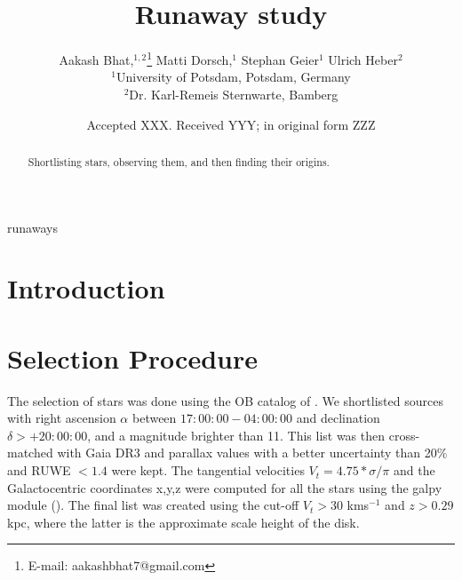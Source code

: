 \documentclass[fleqn,usenatbib]{mnras}
\title[Ondrejov]{Runaway study}
\author[Aakash Bhat et al.]{
Aakash Bhat,$^{1,2}$\thanks{E-mail: aakashbhat7@gmail.com}
Matti Dorsch,$^{1}$
Stephan Geier$^{1}$
Ulrich Heber$^{2}$
\\
$^{1}$University of Potsdam, Potsdam, Germany\\
$^{2}$Dr. Karl-Remeis Sternwarte, Bamberg
}
\date{Accepted XXX. Received YYY; in original form ZZZ}
\begin{document}
\label{firstpage}
\pagerange{\pageref{firstpage}--\pageref{lastpage}}
\maketitle

\begin{abstract}
Shortlisting stars, observing them, and then finding their origins.
\end{abstract}

\begin{keywords}
runaways
\end{keywords}



\section{Introduction}


\section{Selection Procedure}

The selection of stars was done using the OB catalog of \citet{2003AJ....125.2531R}. We shortlisted sources with right ascension $\alpha$ between $17:00:00-04:00:00$ and declination $\delta>+20:00:00$, and a magnitude brighter than 11. This list was then cross-matched with Gaia DR3 and parallax values with a better uncertainty than 20\% and RUWE $<1.4$ were kept. The tangential velocities $V_{t}=4.75*\sigma/\pi$ and the Galactocentric coordinates x,y,z were computed for all the stars using the galpy module (\cite{2015ApJS..216...29B}). The final list was created using the cut-off $V_{t}>30$ kms$^{-1}$ and $z>0.29$ kpc, where the latter is the approximate scale height of the disk.
\end{document}
